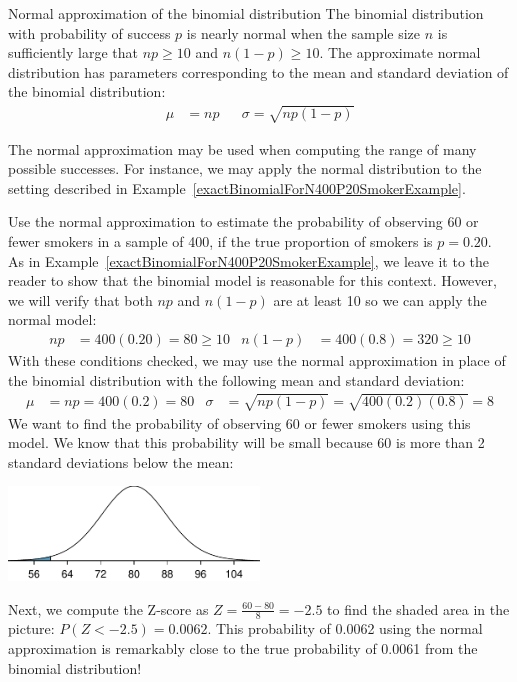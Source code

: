 \begin{onebox}{Normal approximation of the binomial distribution}
The binomial distribution with probability of success $p$ is nearly normal when the sample size $n$ is sufficiently large that $np\ge 10$ and $n(1-p)\ge 10$. The approximate normal distribution has parameters corresponding to the mean and standard deviation of the binomial distribution:\vspace{-1.5mm}
\begin{align*}
\mu &= np
&&\sigma= \sqrt{np(1-p)}
\end{align*}\end{onebox}

The normal approximation may be used when computing the range of many possible successes. For instance, we may apply the normal distribution to the setting described in Example~\ref{exactBinomialForN400P20SmokerExample}.

\begin{examplewrap}
\begin{nexample}{Use the normal approximation to estimate the probability of observing 60 or fewer smokers in a sample of 400, if the true proportion of smokers is $p=0.20$.}\label{approxBinomialForN400P20SmokerExample}
As in Example~\ref{exactBinomialForN400P20SmokerExample},  we leave it to the reader to show that the binomial model is reasonable for this context. However, we will verify that both $np$ and $n(1-p)$ are at least 10 so we can apply the normal model:
\begin{align*}
np&=400(0.20)=80\ge 10
&
n(1-p)&=400(0.8)=320\ge 10
\end{align*}
With these conditions checked, we may use the normal approximation in place of the binomial distribution with the following mean and standard deviation:
\begin{align*}
\mu &= np = 400(0.2)=80
&
\sigma &= \sqrt{np(1-p)} = \sqrt{400(0.2)(0.8)}= 8
\end{align*}
We want to find the probability of observing 60 or fewer smokers using this model. We know that this probability will be small because 60 is more than 2 standard deviations below the mean:
\begin{center}
\includegraphics[width=0.5\textwidth]{ch_distributions/figures/smallTownSmokers/smallTownSmokers}
\end{center}
Next, we compute the Z-score as $Z=\frac{60 - 80}{8} = -2.5$ to find the shaded area in the picture: $P(Z < -2.5) = 0.0062$. This probability of 0.0062 using the normal approximation is remarkably close to the true probability of 0.0061 from the binomial distribution!
\end{nexample}
\end{examplewrap}

